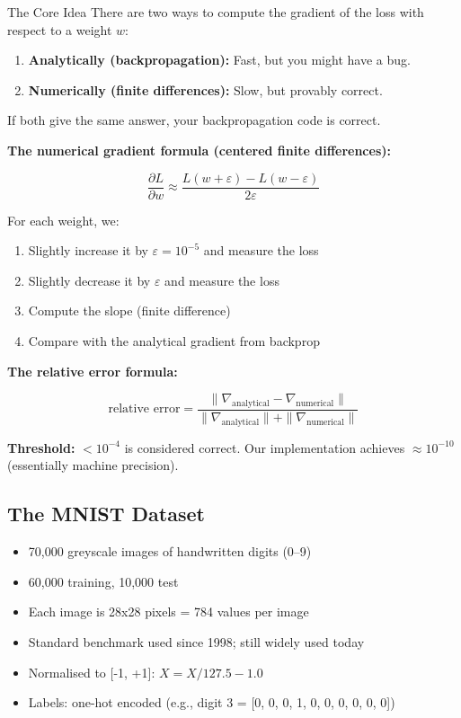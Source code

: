 \documentclass[12pt, a4paper]{article}
\begin{document}
\begin{conceptbox}{The Core Idea}
There are two ways to compute the gradient of the loss with respect to a weight $w$:
\begin{enumerate}
  \item \textbf{Analytically (backpropagation):} Fast, but you might have a bug.
  \item \textbf{Numerically (finite differences):} Slow, but provably correct.
\end{enumerate}
If both give the same answer, your backpropagation code is correct.
\end{conceptbox}

\textbf{The numerical gradient formula (centered finite differences):}

\begin{equation}
  \frac{\partial L}{\partial w} \approx \frac{L(w + \varepsilon) - L(w - \varepsilon)}{2\varepsilon}
\end{equation}

For each weight, we:
\begin{enumerate}
  \item Slightly increase it by $\varepsilon = 10^{-5}$ and measure the loss
  \item Slightly decrease it by $\varepsilon$ and measure the loss
  \item Compute the slope (finite difference)
  \item Compare with the analytical gradient from backprop
\end{enumerate}

\textbf{The relative error formula:}

\begin{equation}
  \text{relative error} = \frac{\|\nabla_{\text{analytical}} - \nabla_{\text{numerical}}\|}{\|\nabla_{\text{analytical}}\| + \|\nabla_{\text{numerical}}\|}
\end{equation}

\textbf{Threshold:} $< 10^{-4}$ is considered correct. Our implementation achieves $\approx 10^{-10}$ (essentially machine precision).

\subsection{The MNIST Dataset}

\begin{itemize}
  \item 70,000 greyscale images of handwritten digits (0--9)
  \item 60,000 training, 10,000 test
  \item Each image is 28x28 pixels = 784 values per image
  \item Standard benchmark used since 1998; still widely used today
  \item Normalised to [-1, +1]: $X = X / 127.5 - 1.0$
  \item Labels: one-hot encoded (e.g., digit 3 = [0, 0, 0, 1, 0, 0, 0, 0, 0, 0])
\end{itemize}
\end{document}
